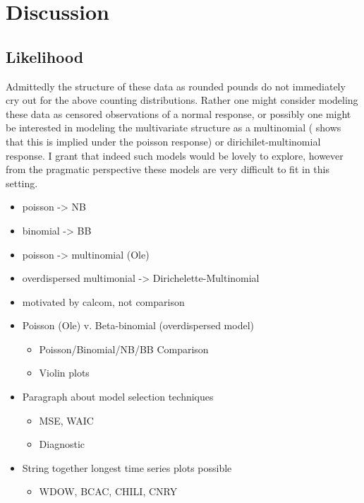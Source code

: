 \documentclass[12pt]{article}
\begin{document}
%
%
\section{Discussion}\label{}
%
%

%
%
\subsection{Likelihood}
%
%

Admittedly the structure of these data as rounded pounds do not immediately cry 
out for the above counting distributions. Rather one might consider modeling 
these data as censored observations of a normal response, or possibly one might 
be interested in modeling the multivariate structure as a multinomial 
( shows that this is implied under the 
poisson response) or dirichilet-multinomial response. I grant that indeed such 
models would be lovely to explore, however from the pragmatic perspective these 
models are very difficult to fit in this setting. 

\begin{itemize}
	\item poisson -> NB
	\item binomial -> BB
	\item poisson -> multinomial (Ole)
	\item overdispersed multimonial -> Dirichelette-Multinomial
\end{itemize}




%
\begin{itemize}
\item motivated by calcom, not comparison
\item Poisson (Ole) v. Beta-binomial (overdispersed model)
	\begin{itemize}
	\item Poisson/Binomial/NB/BB Comparison
	\item Violin plots
	\end{itemize}
\item Paragraph about model selection techniques
	\begin{itemize}
	\item MSE, WAIC
	\item Diagnostic
	\end{itemize}
\item String together longest time series plots possible
	\begin{itemize}
	\item WDOW, BCAC, CHILI, CNRY
	\end{itemize}
\end{itemize}
\end{document}
